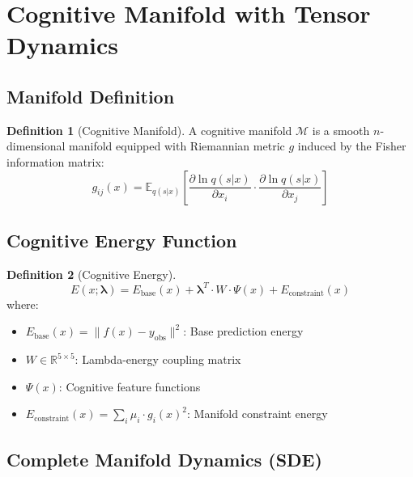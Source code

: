 \documentclass[11pt,a4paper]{article}
\theoremstyle{definition}
\newtheorem{definition}{Definition}[section]
\theoremstyle{remark}
\newcommand{\lambdavec}{\boldsymbol{\lambda}}
\newcommand{\M}{\mathcal{M}}
\newcommand{\R}{\mathbb{R}}
\newcommand{\E}{\mathbb{E}}
\begin{document}
\section{Cognitive Manifold with Tensor Dynamics}\label{sec:manifold}

\subsection{Manifold Definition}\label{subsec:manifold-def}

\begin{definition}[Cognitive Manifold]\label{def:cognitive-manifold}
A cognitive manifold $\M$ is a smooth $n$-dimensional manifold equipped with Riemannian metric $g$ induced by the Fisher information matrix:
\begin{equation}
g_{ij}(x) = \E_{q(s|x)}\left[\frac{\partial \ln q(s|x)}{\partial x_i} \cdot \frac{\partial \ln q(s|x)}{\partial x_j}\right]
\end{equation}
\end{definition}

\subsection{Cognitive Energy Function}\label{subsec:energy}

\begin{definition}[Cognitive Energy]\label{def:cognitive-energy}
\begin{equation}
E(x; \lambdavec) = E_{\text{base}}(x) + \lambdavec^T \cdot W \cdot \Psi(x) + E_{\text{constraint}}(x)
\end{equation}
where:
\begin{itemize}
    \item $E_{\text{base}}(x) = \|f(x) - y_{\text{obs}}\|^2$: Base prediction energy
    \item $W \in \R^{5 \times 5}$: Lambda-energy coupling matrix
    \item $\Psi(x)$: Cognitive feature functions
    \item $E_{\text{constraint}}(x) = \sum_i \mu_i \cdot g_i(x)^2$: Manifold constraint energy
\end{itemize}
\end{definition}

\subsection{Complete Manifold Dynamics (SDE)}\label{subsec:manifold-dynamics}
\end{document}
